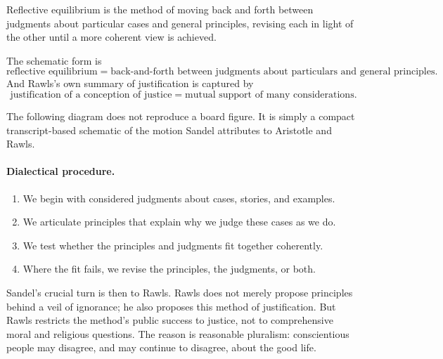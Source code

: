 \begin{definition}
Reflective equilibrium is the method of moving back and forth between judgments about particular cases and general principles, revising each in light of the other until a more coherent view is achieved.
\end{definition}

The schematic form is
\begin{equation}
\text{reflective equilibrium}
=
\text{back-and-forth between judgments about particulars and general principles}.
\end{equation}
And Rawls's own summary of justification is captured by
\begin{equation}
\text{justification of a conception of justice}
=
\text{mutual support of many considerations}.
\end{equation}

The following diagram does not reproduce a board figure. It is simply a compact transcript-based schematic of the motion Sandel attributes to Aristotle and Rawls.

\begin{figure}[h]
\centering
{}
\end{figure}

\paragraph{Dialectical procedure.}
\begin{enumerate}
\item We begin with considered judgments about cases, stories, and examples.
\item We articulate principles that explain why we judge these cases as we do.
\item We test whether the principles and judgments fit together coherently.
\item Where the fit fails, we revise the principles, the judgments, or both.
\end{enumerate}

Sandel's crucial turn is then to Rawls. Rawls does not merely propose principles behind a veil of ignorance; he also proposes this method of justification. But Rawls restricts the method's public success to justice, not to comprehensive moral and religious questions. The reason is reasonable pluralism: conscientious people may disagree, and may continue to disagree, about the good life.

